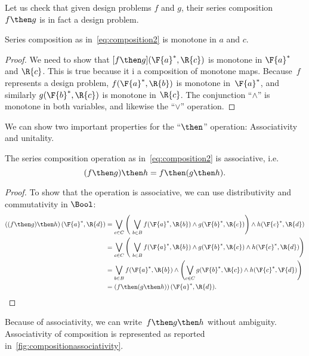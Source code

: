Let us check that given design problems $f$ and $g$, their series composition $f\then g$ is in fact a design problem.
\begin{lemma}
    Series composition as in~\cref{eq:composition2} is monotone in $a$ and $c$.
\end{lemma}
\begin{proof}
 We need to show that $[f\then g](\F{a}^*,\R{c})$ is monotone in $\F{a}^*$ and $\R{c}$. This is true
 because it i a composition of monotone maps. Because~$f$ represents a design problem, $f(\F{a}^*,\R{b})$ is monotone in~$\F{a}^*$, and similarly $g(\F{b}^*,\R{c})$  is monotone in $\R{c}$. The conjunction ``$\wedge$'' is monotone in both variables, and likewise the ``$\vee$'' operation.
 \end{proof}

\noindent We can show two important properties for the ``$\then$'' operation: Associativity and unitality.

\begin{lemma}
    The series composition operation as in~\cref{eq:composition2} is associative, i.e. 
    \begin{equation}
        (f\then g)\then h = f\then (g\then h).
    \end{equation}
\end{lemma}

\begin{proof}
To show that the operation is associative, we can use distributivity and commutativity in $\Bool$:
%
\begin{equation}
\begin{aligned}
\left((f\then g) \then h\right) (\F{a}^*,\R{d})
&= \bigvee_{c \in C} \left (\ \bigvee_{b\in B } f(\F{a}^*,\R{b}) \wedge g(\F{b}^*,\R{c}) \right )  \wedge  h (\F{c}^*, \R{d}) \\
&= \bigvee_{c \in C} \left (\ \bigvee_{b\in B } f(\F{a}^*,\R{b})
\wedge g(\F{b}^*,\R{c}) \wedge h (\F{c}^*, \R{d})
    \right ) \\
&= \bigvee_{b \in B } f(\F{a}^*,\R{b}) \wedge \left ( \bigvee_{c\in C} g(\F{b}^*,\R{c}) \wedge h (\F{c}^*, \F{d}) \right ) \\
&= \left(f \then (g \then h )\right) (\F{a}^*, \R{d}).
\end{aligned}
\end{equation}
%
\end{proof}

Because of associativity, we can write~$f\then g\then h$ without ambiguity.
Associativity of composition is represented as reported in~\cref{fig:compositionassociativity}.


